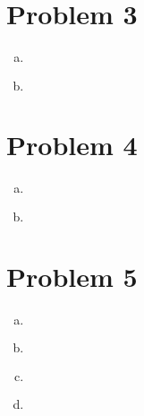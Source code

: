 \documentclass{article}
\begin{document}
\begin{flushleft}
	\section*{Problem 3}
	
\begin{enumerate}[(a)]
	\item 
	\begin{multline*}\\
	\end{multline*}
	\item 
	\begin{multline*}\\
	\end{multline*}

\end{enumerate}

	\section*{Problem 4}
	
\begin{enumerate}[(a)]
	\item 
\begin{multline*}\\
\end{multline*}
	\item 
\begin{multline*}\\
\end{multline*}

\end{enumerate}

	\section*{Problem 5}
	
\begin{enumerate}[(a)]
	\item 
	\begin{multline*}\\
	\end{multline*}
	\item 
	\begin{multline*}\\
	\end{multline*}
	\item 
	\begin{multline*}\\
	\end{multline*}
	\item 
	\begin{multline*}\\
	\end{multline*}
	
\end{enumerate}

\end{flushleft}
\end{document}
